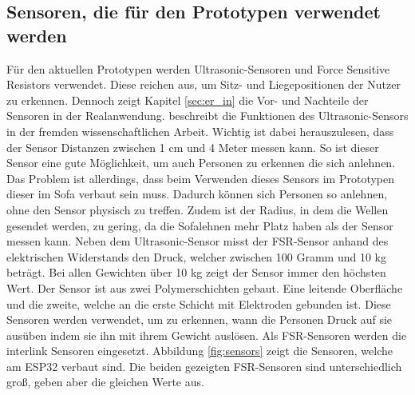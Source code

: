 \subsection{Sensoren, die für den Prototypen verwendet werden}
Für den aktuellen Prototypen werden Ultrasonic-Sensoren und Force Sensitive Resistors verwendet. 
Diese reichen aus, um Sitz- und Liegepositionen der Nutzer zu erkennen. Dennoch zeigt Kapitel \ref{sec:er_in} die Vor- und Nachteile der Sensoren in der Realanwendung. \citep{de2018obstacle} beschreibt die Funktionen des Ultrasonic-Sensors in der fremden wissenschaftlichen Arbeit. Wichtig ist dabei herauszulesen, dass der Sensor Distanzen zwischen 1 cm und 4 Meter messen kann. So ist dieser Sensor eine gute Möglichkeit, um auch Personen zu erkennen die sich anlehnen. Das Problem ist allerdings, dass beim Verwenden dieses Sensors im Prototypen dieser im Sofa verbaut sein muss. Dadurch können sich Personen so anlehnen, ohne den Sensor physisch zu treffen. Zudem ist der Radius, in dem die Wellen gesendet werden, zu gering, da die Sofalehnen mehr Platz haben als der Sensor messen kann.
\newline
Neben dem Ultrasonic-Sensor misst der FSR-Sensor anhand des elektrischen Widerstands den Druck, welcher zwischen 100 Gramm und 10 kg beträgt. Bei allen Gewichten über 10 kg zeigt der Sensor immer den höchsten Wert. \citep{florez2010calibration} Der Sensor ist aus zwei Polymerschichten gebaut. Eine leitende Oberfläche und die zweite, welche an die erste Schicht mit Elektroden gebunden ist. \citep{hollinger2006evaluation} Diese Sensoren werden verwendet, um zu erkennen, wann die Personen Druck auf sie ausüben indem sie ihn mit ihrem Gewicht auslösen. Als FSR-Sensoren werden die interlink Sensoren eingesetzt. Abbildung \ref{fig:sensors} zeigt die Sensoren, welche am ESP32 verbaut sind. Die beiden gezeigten FSR-Sensoren sind unterschiedlich groß, geben aber die gleichen Werte aus.

